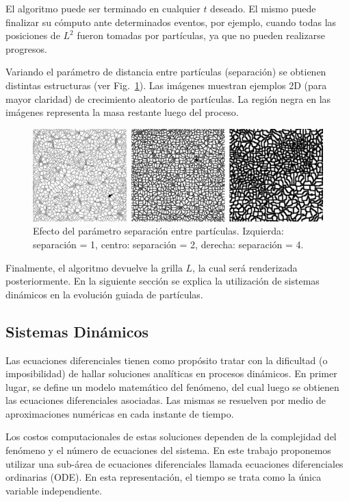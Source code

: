 El algoritmo puede ser terminado en cualquier $t$ deseado. El mismo puede finalizar su c\'omputo ante determinados eventos, por ejemplo, cuando todas las posiciones de $L^{2}$ fueron tomadas por part\'iculas, ya que no pueden realizarse progresos.

Variando el par\'ametro de distancia entre part\'iculas (separación) se obtienen distintas estructuras (ver Fig.~\ref{fg:sistdin1}). Las im\'agenes muestran ejemplos 2D (para mayor claridad) de crecimiento aleatorio de part\'iculas. La regi\'on negra en las im\'agenes representa la masa restante luego del proceso.


\begin{figure}[htb!]
  \centerline{\includegraphics[width=12cm]{figures/Fig1}}
  \caption[Efecto del parámetro separación entre partículas.]{Efecto del parámetro separación entre partículas. Izquierda: separaci\'on = 1, centro: separaci\'on = 2, derecha: separaci\'on = 4.}
  \label{fg:sistdin1}
\end{figure}

Finalmente, el algoritmo devuelve la grilla $L$, la cual ser\'a renderizada posteriormente. En la siguiente secci\'on se explica la utilizaci\'on de sistemas din\'amicos en la evoluci\'on guiada de part\'iculas.

\subsection{Sistemas Din\'amicos}

Las ecuaciones diferenciales tienen como prop\'osito tratar con la dificultad (o imposibilidad) de hallar soluciones anal\'iticas en procesos din\'amicos.
En primer lugar, se define un modelo matem\'atico del fenómeno, del cual luego se obtienen 
las ecuaciones diferenciales asociadas. Las mismas se resuelven por medio de aproximaciones num\'ericas en cada instante de tiempo.

Los costos computacionales de estas soluciones dependen de la complejidad del fenómeno y el n\'umero de ecuaciones del sistema. En este trabajo proponemos utilizar una sub-\'area de ecuaciones diferenciales llamada ecuaciones diferenciales ordinarias (ODE). En esta representaci\'on, el tiempo se trata como la \'unica variable independiente.


